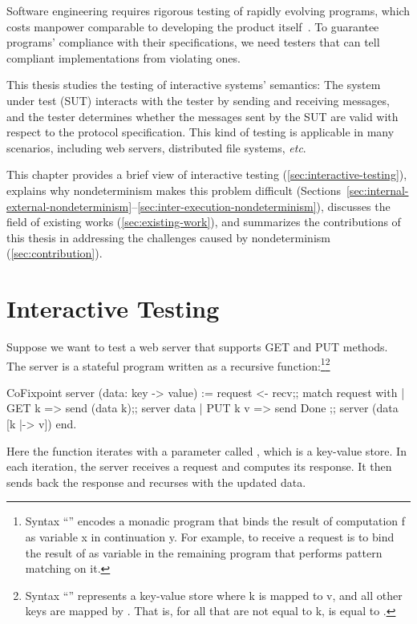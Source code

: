 Software engineering requires rigorous testing of rapidly evolving programs,
which costs manpower comparable to developing the product itself~\cite{vailshery}.  To guarantee
programs' compliance with their specifications, we need testers that can tell
compliant implementations from violating ones.

This thesis studies the testing of interactive systems' semantics: The system
under test (SUT) interacts with the tester by sending and receiving messages,
and the tester determines whether the messages sent by the SUT are valid with
respect to the protocol specification.  This kind of testing is applicable in
many scenarios, including web servers, distributed file systems, {\it etc}.

This chapter provides a brief view of interactive testing
(\autoref{sec:interactive-testing}), explains why nondeterminism makes this
problem difficult
(Sections~\ref{sec:internal-external-nondeterminism}--\ref{sec:inter-execution-nondeterminism}),
discusses the field of existing works (\autoref{sec:existing-work}), and
summarizes the contributions of this thesis in addressing the challenges caused
by nondeterminism (\autoref{sec:contribution}).

\section{Interactive Testing}
\label{sec:interactive-testing}
Suppose we want to test a web server that supports GET and PUT methods.  The
server is a stateful program written as a recursive function:\footnote{Syntax
``'' encodes a monadic program that binds the result of
computation \ilc f as variable \ilc x in continuation \ilc y.  For example, to
receive a request is to bind the result of  as variable 
in the remaining program that performs pattern matching on it.}\footnote{Syntax
``'' represents a key-value store where \ilc k is mapped
to \ilc v, and all other keys are mapped by .  That is, for
all  that are not equal to \ilc k,  is equal
to .}
\begin{coq}
  CoFixpoint server (data: key -> value) :=
    request <- recv;;
    match request with
    | GET k   => send (data k);; server  data
    | PUT k v => send  Done   ;; server (data [k |-> v])
    end.
\end{coq}
Here the  function iterates with a parameter called ,
which is a key-value store.  In each iteration, the server receives a request
and computes its response.  It then sends back the response and recurses with
the updated data.

